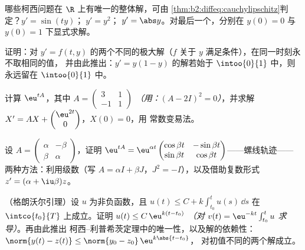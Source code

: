 \begin{exercise}[$\star$]\label{exo:b2:diffeq:2}
哪些柯西问题在 $\R$ 上有唯一的整体解，可由
\cref{thm:b2:diffeq:cauchylipschitz}判定？$y' = \sin(ty)$；$\;y' =
y^2$；$\;y' = \abs y$。对最后一个，分别在 $y(0) =
0$ 与 $y(0) = 1$ 下显式求解。
\end{exercise}

\begin{exercise}[$\star$]\label{exo:b2:diffeq:3}
证明：对 $y' = f(t,y)$ 的两个不同的极大解（$f$
关于 $y$ 满足条件），在同一时刻永不取相同的值，
并由此推出：$y' = y(1 - y)$ 的解若始于
$\intoo{0}{1}$ 中，则永远留在 $\intoo{0}{1}$ 中。
\end{exercise}

\begin{exercise}[$\star\star$]\label{exo:b2:diffeq:4}
计算 $\eu^{tA}$，其中 $A = \begin{pmatrix} 3 & 1\\ -1 &
1\end{pmatrix}$ \emph{（用：$(A - 2I)^2 = 0$）}，并求解 $X' =
AX + \begin{pmatrix} \eu^{2t}\\ 0\end{pmatrix}$，$X(0) = 0$，用
常数变易法。
\end{exercise}

\begin{exercise}[$\star\star$]\label{exo:b2:diffeq:5}
设 $A = \begin{pmatrix} \alpha & -\beta\\ \beta &
\alpha\end{pmatrix}$，证明 $\eu^{tA} =
\eu^{\alpha t}\begin{pmatrix} \cos\beta t & -\sin\beta t\\
\sin\beta t & \cos\beta t\end{pmatrix}$——螺线轨迹——
两种方法：利用级数（写 $A = \alpha I + \beta J$，$J^2 =
-I$），以及借助复数形式 $z' = (\alpha +
\iu\beta)z$。
\end{exercise}

\begin{exercise}[$\star\star$]\label{exo:b2:diffeq:6}
（格朗沃尔引理）设 $u$ 为非负函数，且 $u(t)
\leq C + k\int_{t_0}^{t} u(s)\,\dd s$ 在 $\intco{t_0}{T}$ 上成立。证明
$u(t) \leq C\,\eu^{k(t - t_0)}$ \emph{（对 $v(t) =
\eu^{-kt}\int_{t_0}^t u$ 求导）}。再由此推出
柯西--利普希茨定理中的唯一性，以及解的依赖性：$\norm{y(t) -
z(t)} \leq \norm{y_0 - z_0}\,\eu^{k\abs{t - t_0}}$，
对初值不同的两个解成立。
\end{exercise}

